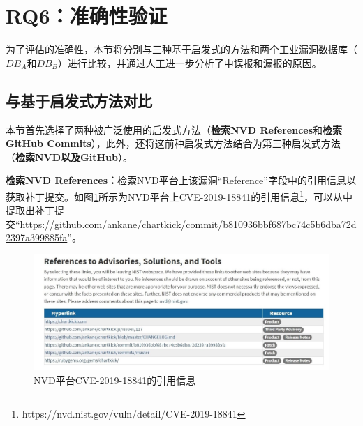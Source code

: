 \section{RQ6：准确性验证}\label{sec:accuracy-evaluation}

为了评估\tool 的准确性，本节将\tool 分别与三种基于启发式的方法和两个工业漏洞数据库（$DB_A$和$DB_B$）进行比较，并通过人工进一步分析了\tool 中误报和漏报的原因。

\subsection{与基于启发式方法对比}
本节首先选择了两种被广泛使用的启发式方法（\textbf{检索NVD References}和\textbf{检索GitHub Commits}），此外，还将这前种启发式方法结合为第三种启发式方法（\textbf{检索NVD以及GitHub}）。

\textbf{检索NVD References：}检索NVD平台上该漏洞“Reference”字段中的引用信息以获取补丁提交\cite{duan2019automating,li2016vulpecker,li2018vuldeepecker}。如图\ref{fig:CVE-2019-18841}所示为NVD平台上CVE-2019-18841的引用信息\footnote{https://nvd.nist.gov/vuln/detail/CVE-2019-18841}，可以从中提取出补丁提交“\url{https://github.com/ankane/chartkick/commit/b810936bbf687bc74c5b6dba72d2397a399885fa}”。
\begin{figure}[h]
    \centering
    \includegraphics[scale=0.44]{fig/NVD-2019-18841}
    \caption{NVD平台CVE-2019-18841的引用信息}\label{fig:CVE-2019-18841}
\end{figure}

